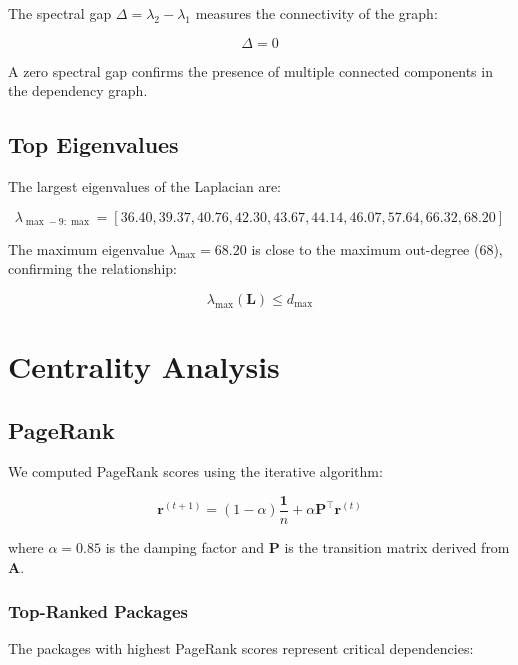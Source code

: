 \documentclass[11pt,a4paper]{article}
\begin{document}
The spectral gap $\Delta = \lambda_2 - \lambda_1$ measures the connectivity of the graph:

\begin{equation}
\Delta = 0
\end{equation}

A zero spectral gap confirms the presence of multiple connected components in the dependency graph.

\subsection{Top Eigenvalues}

The largest eigenvalues of the Laplacian are:

\begin{equation}
\lambda_{\max-9:\max} = [36.40, 39.37, 40.76, 42.30, 43.67, 44.14, 46.07, 57.64, 66.32, 68.20]
\end{equation}

The maximum eigenvalue $\lambda_{\max} = 68.20$ is close to the maximum out-degree (68), confirming the relationship:

\begin{equation}
\lambda_{\max}(\mathbf{L}) \leq d_{\max}
\end{equation}

\section{Centrality Analysis}

\subsection{PageRank}

We computed PageRank scores using the iterative algorithm:

\begin{equation}
\mathbf{r}^{(t+1)} = (1-\alpha)\frac{\mathbf{1}}{n} + \alpha \mathbf{P}^\top \mathbf{r}^{(t)}
\end{equation}

where $\alpha = 0.85$ is the damping factor and $\mathbf{P}$ is the transition matrix derived from $\mathbf{A}$.

\subsubsection{Top-Ranked Packages}

The packages with highest PageRank scores represent critical dependencies:
\end{document}
